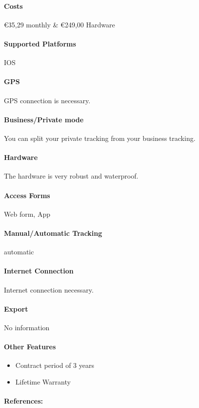 \paragraph{Costs} \euro 35,29 monthly \& \euro 249,00 Hardware
\paragraph{Supported Platforms} IOS
\paragraph{GPS} GPS connection is necessary.
\paragraph{Business/Private mode} You can split your private tracking from your business tracking.
\paragraph{Hardware}The hardware is very robust and waterproof.
\paragraph{Access Forms}Web form, App
\paragraph{Manual/Automatic Tracking}automatic
\paragraph{Internet Connection}Internet connection necessary.
\paragraph{Export}No information
\paragraph{Other Features} 
\begin{itemize}
\item Contract period of 3 years
\item Lifetime Warranty
\end{itemize}
\paragraph{References:} \cite{Abax_Triplog}
\newpage

